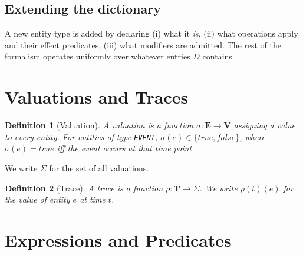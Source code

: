 \documentclass{article}
\newtheorem{definition}{Definition}
\begin{document}
\subsection{Extending the dictionary}

A new entity type is added by declaring (i) what it \emph{is}, (ii) what operations apply and their effect predicates, (iii) what modifiers are admitted. The rest of the formalism operates uniformly over whatever entries $D$ contains.

\section{Valuations and Traces}

\begin{definition}[Valuation]
    A valuation is a function $\sigma : \mathbf{E} \to \mathbf{V}$ assigning a value to every entity. For entities of type \texttt{EVENT}, $\sigma(e) \in \{\mathit{true}, \mathit{false}\}$, where $\sigma(e) = \mathit{true}$ iff the event occurs at that time point.
\end{definition}

We write $\Sigma$ for the set of all valuations.

\begin{definition}[Trace]
    A trace is a function $\rho : \mathbf{T} \to \Sigma$. We write $\rho(t)(e)$ for the value of entity $e$ at time $t$.
\end{definition}

\section{Expressions and Predicates}
\end{document}
